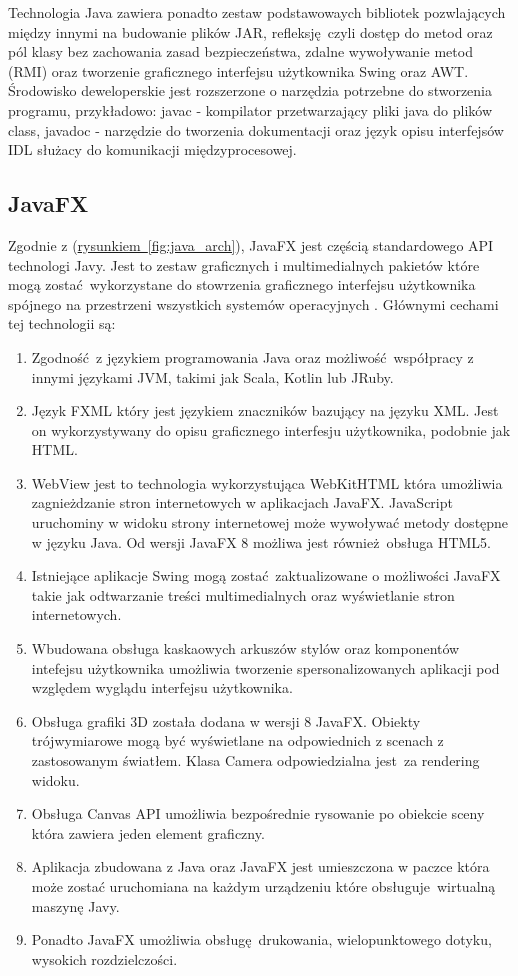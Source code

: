 Technologia Java zawiera ponadto zestaw podstawowaych bibliotek pozwlających między innymi na budowanie plików JAR, refleksję czyli dostęp do metod oraz pól klasy bez zachowania zasad bezpieczeństwa, zdalne wywoływanie metod (RMI) oraz tworzenie graficznego interfejsu użytkownika Swing oraz AWT. Środowisko deweloperskie jest rozszerzone o narzędzia potrzebne do stworzenia programu, przykładowo: javac - kompilator przetwarzający pliki java do plików class, javadoc - narzędzie do tworzenia dokumentacji oraz język opisu interfejsów IDL służacy do komunikacji międzyprocesowej.
\subsection{JavaFX}
Zgodnie z (\hyperref[fig:java_arch]{rysunkiem~\ref*{fig:java_arch}}), JavaFX jest częścią standardowego API technologi Javy. Jest to zestaw graficznych i multimedialnych pakietów które mogą zostać wykorzystane do stowrzenia graficznego interfejsu użytkownika spójnego na przestrzeni wszystkich systemów operacyjnych \cite{JavaFxInfo}. Głównymi cechami tej technologii są:
\begin{enumerate}
  \item Zgodność z językiem programowania Java oraz możliwość współpracy z innymi językami JVM, takimi jak Scala, Kotlin lub JRuby.
  \item Język FXML który jest językiem znaczników bazujący na języku XML. Jest on wykorzystywany do opisu graficznego interfesju użytkownika, podobnie jak HTML.
  \item WebView jest to technologia wykorzystująca WebKitHTML która umożliwia zagnieżdzanie stron internetowych w aplikacjach JavaFX. JavaScript uruchominy w widoku strony internetowej może wywoływać metody dostępne w języku Java. Od wersji JavaFX 8 możliwa jest również obsługa HTML5.
  \item Istniejące aplikacje Swing mogą zostać zaktualizowane o możliwości JavaFX takie jak odtwarzanie treści multimedialnych oraz wyświetlanie stron internetowych.
  \item Wbudowana obsługa kaskaowych arkuszów stylów oraz komponentów intefejsu użytkownika umożliwia tworzenie spersonalizowanych aplikacji pod względem wyglądu interfejsu użytkownika.
  \item Obsługa grafiki 3D została dodana w wersji 8 JavaFX. Obiekty trójwymiarowe mogą być wyświetlane na odpowiednich z scenach z zastosowanym światłem. Klasa Camera odpowiedzialna jest za rendering widoku.
  \item Obsługa Canvas API umożliwia bezpośrednie rysowanie po obiekcie sceny która zawiera jeden element graficzny.
  \item Aplikacja zbudowana z Java oraz JavaFX jest umieszczona w paczce która może zostać uruchomiana na każdym urządzeniu które obsługuje wirtualną maszynę Javy.
  \item Ponadto JavaFX umożliwia obsługę drukowania, wielopunktowego dotyku, wysokich rozdzielczości.
\end{enumerate}

